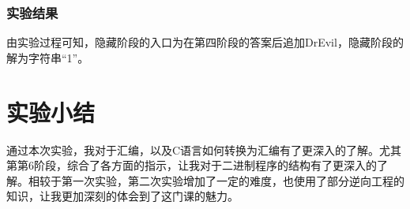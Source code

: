 \subsubsection{实验结果}
由实验过程可知，隐藏阶段的入口为在第四阶段的答案后追加DrEvil，隐藏阶段的解为字符串``1''。

\section{实验小结}
通过本次实验，我对于汇编，以及C语言如何转换为汇编有了更深入的了解。尤其第第6阶段，综合了各方面的指示，让我对于二进制程序的结构有了更深入的了解。相较于第一次实验，第二次实验增加了一定的难度，也使用了部分逆向工程的知识，让我更加深刻的体会到了这门课的魅力。


